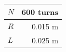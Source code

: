 \begin{tabular}{| l | r |} \hline
    
    $N$  &  600 turns \\ \hline
    $R$  &  0.015 m   \\ \hline
    $L$  &  0.025 m   \\ \hline
    
\end{tabular}